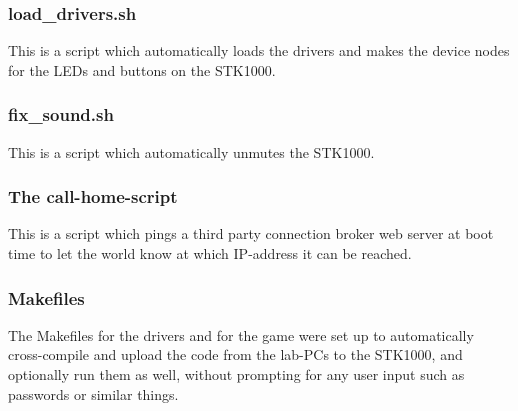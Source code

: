 \subsubsection{load\_drivers.sh}
This is a script which automatically loads the drivers and makes the device nodes for the LEDs and buttons on the STK1000.

\subsubsection{fix\_sound.sh}
This is a script which automatically unmutes the STK1000.

\subsubsection{The call-home-script}
This is a script which pings a third party connection broker web server at boot time to let the world know at which IP-address it can be reached.

\subsubsection{Makefiles}
The Makefiles for the drivers and for the game were set up to automatically cross-compile and upload the code from the lab-PCs to the STK1000, and optionally run them as well, without prompting for any user input such as passwords or similar things.

